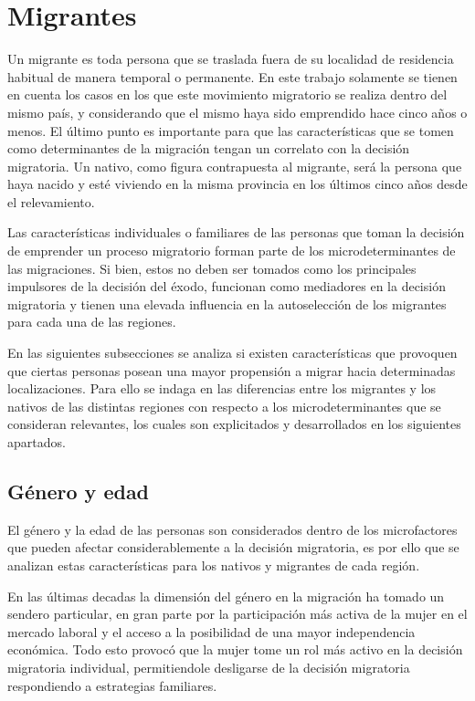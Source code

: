 \documentclass[12pt,a4paper]{article}
\begin{document}
\section{Migrantes}
Un migrante es toda persona que se traslada fuera de su localidad de residencia habitual de manera temporal o permanente. En este trabajo solamente se tienen en cuenta los casos en los que este movimiento migratorio se realiza dentro del mismo país, y considerando que el mismo haya sido emprendido hace cinco años o menos. El último punto es importante para que las características que se tomen como determinantes de la migración tengan un correlato con la decisión migratoria. Un nativo, como figura contrapuesta al migrante, será la persona que haya nacido y esté viviendo en la misma provincia en los últimos cinco años desde el relevamiento.

Las características individuales o familiares de las personas que toman la decisión de emprender un proceso migratorio forman parte de los microdeterminantes de las migraciones. Si bien, estos no deben ser tomados como los principales impulsores de la decisión del éxodo, funcionan como mediadores en la decisión migratoria y tienen una elevada influencia en la autoselección de los migrantes para cada una de las regiones.

En las siguientes subsecciones se analiza si existen características que provoquen que ciertas personas posean una mayor propensión a migrar hacia determinadas localizaciones. Para ello se indaga en las diferencias entre los migrantes y los nativos de las distintas regiones con respecto a los microdeterminantes que se consideran relevantes, los cuales son explicitados y desarrollados en los siguientes apartados.


\subsection{Género y edad}
El género y la edad de las personas son considerados dentro de los microfactores que pueden afectar considerablemente a la decisión migratoria, es por ello que se analizan estas características para los nativos y migrantes de cada región.

En las últimas decadas la dimensión del género en la migración ha tomado un sendero particular, en gran parte por la participación más activa de la mujer en el mercado laboral y el acceso a la posibilidad de una mayor independencia económica. Todo esto provocó que la mujer tome un rol más activo en la decisión migratoria individual, permitiendole desligarse de la decisión migratoria respondiendo a estrategias  familiares.
\end{document}
